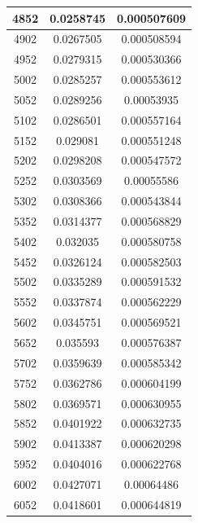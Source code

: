 \documentclass{article}
\begin{document}
\begin{longtable}{|c|c|c|}
		4852	&  0.0258745  	 &  0.000507609  \\ \hline                  
		4902	&  0.0267505  	 &  0.000508594  \\ \hline                  
		4952	&  0.0279315  	 &  0.000530366  \\ \hline                  
		5002	&  0.0285257  	 &  0.000553612  \\ \hline                  
		5052	&  0.0289256  	 &  0.00053935   \\ \hline                 
		5102	&  0.0286501  	 &  0.000557164  \\ \hline                  
		5152	&  0.029081   	 &  0.000551248  \\ \hline                  
		5202	&  0.0298208  	 &  0.000547572  \\ \hline                  
		5252	&  0.0303569  	 &  0.00055586   \\ \hline                 
		5302	&  0.0308366  	 &  0.000543844  \\ \hline                  
		5352	&  0.0314377  	 &  0.000568829  \\ \hline                  
		5402	&  0.032035   	 &  0.000580758  \\ \hline                  
		5452	&  0.0326124  	 &  0.000582503  \\ \hline                  
		5502	&  0.0335289  	 &  0.000591532  \\ \hline                  
		5552	&  0.0337874  	 &  0.000562229  \\ \hline                  
		5602	&  0.0345751  	 &  0.000569521  \\ \hline                  
		5652	&  0.035593   	 &  0.000576387  \\ \hline                  
		5702	&  0.0359639  	 &  0.000585342  \\ \hline                  
		5752	&  0.0362786  	 &  0.000604199  \\ \hline                  
		5802	&  0.0369571  	 &  0.000630955  \\ \hline                  
		5852	&  0.0401922  	 &  0.000632735  \\ \hline                  
		5902	&  0.0413387  	 &  0.000620298  \\ \hline                  
		5952	&  0.0404016  	 &  0.000622768  \\ \hline                  
		6002	&  0.0427071  	 &  0.00064486   \\ \hline                 
		6052	&  0.0418601  	 &  0.000644819  \\ \hline                  

\end{longtable}
\end{document}
